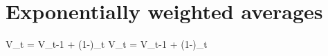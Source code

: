 \documentclass{article}
\begin{document}
\section*{Exponentially weighted averages}

V_{t} = \beta V_{t-1} + (1-\beta)\theta_{t}
V_{t} = \beta V_{t-1} + (1-\beta)\theta_{t}
\end{document}
